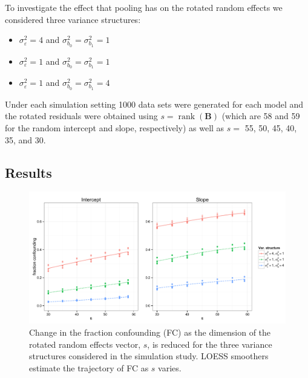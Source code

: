 \documentclass[12pt]{article} %
\DeclareMathOperator{\rank}{rank}
\begin{document}
To investigate the effect that pooling has on the rotated random effects we considered  three variance structures:
%
\begin{itemize}
\item $\sigma^2_\varepsilon = 4$ and  $\sigma^2_{b_0} = \sigma^2_{b_1} = 1$
\item $\sigma^2_\varepsilon = 1$ and  $\sigma^2_{b_0} = \sigma^2_{b_1} = 1$
\item $\sigma^2_\varepsilon = 1$ and  $\sigma^2_{b_0} = \sigma^2_{b_1} = 4$

\end{itemize}
%

Under each simulation setting 1000 data sets were generated for each model and the rotated residuals were obtained using $s = \rank(\bm{B})$ (which are 58 and 59 for the random intercept and slope, respectively) as well as $s =$ 55, 50, 45, 40, 35, and 30.


\subsection{Results}\label{sec:sim-results}




\begin{figure}[h]
	\centering
	\includegraphics[width=\textwidth]{fc_by_s.pdf}
	\caption{\label{fig:fc} Change in the fraction confounding (FC) as the dimension of the rotated random effects vector, $s$, is reduced for the three variance structures considered in the simulation study. LOESS smoothers estimate the trajectory of FC as $s$ varies.}
\end{figure}
\end{document}
